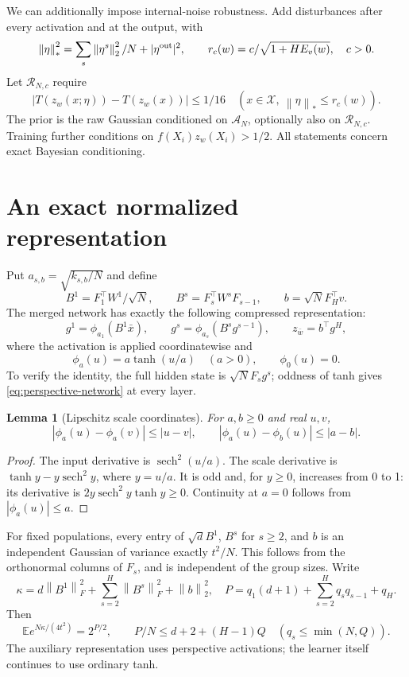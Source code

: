 \documentclass[11pt]{article}
\newtheorem{lemma}[theorem]{Lemma}
\newcommand{\E}{\mathbb E}
\newcommand{\norm}[1]{\left\|#1\right\|}
\begin{document}
We can additionally impose internal-noise robustness. Add disturbances
after every activation and at the output, with
\[
 \norm\eta_*^2=\sum_s\norm{\eta^s}_2^2/N+|\eta^{\rm out}|^2,
 \qquad r_c(w)=c/\sqrt{1+HE_v(w)},\quad c>0.
\]
Let $\mathcal R_{N,c}$ require
\begin{equation}\label{eq:rms-condition}
 |T(z_w(x;\eta))-T(z_w(x))|\le1/16
 \quad(x\in\mathcal X,\ \norm\eta_*\le r_c(w)).
\end{equation}
The prior is the raw Gaussian conditioned on $\mathcal A_N$, optionally
also on $\mathcal R_{N,c}$. Training further conditions on
$f(X_i)z_w(X_i)>1/2$. All statements concern exact Bayesian conditioning.

\section{An exact normalized representation}

Put $a_{s,b}=\sqrt{k_{s,b}/N}$ and define
\[
 B^1=F_1^\top W^1/\sqrt N,\qquad
 B^s=F_s^\top W^sF_{s-1},\qquad b=\sqrt N F_H^\top v.
\]
The merged network has exactly the following compressed representation:
\begin{equation}\label{eq:perspective-network}
 g^1=\phi_{a_1}(B^1\bar x),\qquad
 g^s=\phi_{a_s}(B^sg^{s-1}),\qquad z_{\bar w}=b^\top g^H,
\end{equation}
where the activation is applied coordinatewise and
\[
 \phi_a(u)=a\tanh(u/a)\quad(a>0),\qquad \phi_0(u)=0.
\]
To verify the identity, the full hidden state is $\sqrt N F_sg^s$;
oddness of tanh gives \eqref{eq:perspective-network} at every layer.

\begin{lemma}[Lipschitz scale coordinates]\label{lem:perspective}
For $a,b\ge0$ and real $u,v$,
\[
 |\phi_a(u)-\phi_a(v)|\le|u-v|,\qquad
 |\phi_a(u)-\phi_b(u)|\le|a-b|.
\]
\end{lemma}
\begin{proof}
The input derivative is $\operatorname{sech}^2(u/a)$. The scale derivative
is $\tanh y-y\operatorname{sech}^2y$, where $y=u/a$. It is odd and,
for $y\ge0$, increases from 0 to 1: its derivative is
$2y\operatorname{sech}^2y\tanh y\ge0$. Continuity at $a=0$ follows from
$|\phi_a(u)|\le a$.
\end{proof}

For fixed populations, every entry of $\sqrt d B^1$, $B^s$ for $s\ge2$,
and $b$ is an independent Gaussian of variance exactly $t^2/N$.
This follows from the orthonormal columns of $F_s$, and is independent of
the group sizes. Write
\[
 \kappa=d\norm{B^1}_F^2+\sum_{s=2}^H\norm{B^s}_F^2+\norm b_2^2,
 \quad P=q_1(d+1)+\sum_{s=2}^Hq_sq_{s-1}+q_H.
\]
Then
\begin{equation}\label{eq:mgf}
 \E e^{N\kappa/(4t^2)}=2^{P/2},\qquad
 P/N\le d+2+(H-1)Q\quad(q_s\le\min(N,Q)).
\end{equation}
The auxiliary representation uses perspective activations; the learner
itself continues to use ordinary tanh.
\end{document}
